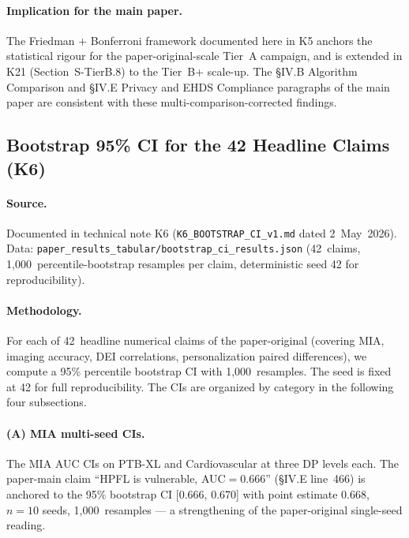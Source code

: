 \documentclass[conference]{IEEEtran}
\begin{document}
\paragraph{Implication for the main paper.} The Friedman $+$ Bonferroni framework documented here in K5 anchors the statistical rigour for the paper-original-scale Tier~A campaign, and is extended in K21 (Section~S-TierB.8) to the Tier~B+ scale-up. The §IV.B Algorithm Comparison and §IV.E Privacy and EHDS Compliance paragraphs of the main paper are consistent with these multi-comparison-corrected findings.

\subsection{Bootstrap 95\% CI for the 42 Headline Claims (K6)}
\label{sec:pre_rebuttal_bootstrap}

\paragraph{Source.} Documented in technical note K6 (\texttt{K6\_BOOTSTRAP\_CI\_v1.md} dated 2~May~2026). Data: \texttt{paper\_results\_tabular/bootstrap\_ci\_results.json} (42~claims, 1{,}000~percentile-bootstrap resamples per claim, deterministic seed 42 for reproducibility).

\paragraph{Methodology.} For each of 42~headline numerical claims of the paper-original (covering MIA, imaging accuracy, DEI correlations, personalization paired differences), we compute a 95\% percentile bootstrap CI with 1{,}000~resamples. The seed is fixed at 42 for full reproducibility. The CIs are organized by category in the following four subsections.

\paragraph{(A) MIA multi-seed CIs.} The MIA AUC CIs on PTB-XL and Cardiovascular at three DP levels each. The paper-main claim ``HPFL is vulnerable, AUC$=$0.666'' (§IV.E line~466) is anchored to the 95\% bootstrap CI [0.666, 0.670] with point estimate 0.668, $n{=}10$ seeds, 1{,}000~resamples --- a strengthening of the paper-original single-seed reading.
\end{document}
